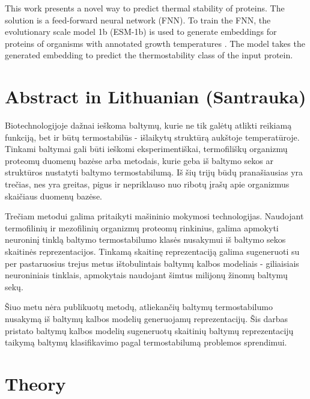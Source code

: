 \documentclass[12pt]{article}
\begin{document}
	This work presents a novel way to predict thermal stability of proteins. 
	The solution is a feed-forward neural network (FNN). To train the FNN, 
	the evolutionary scale model 1b (ESM-1b)\cite{rives2021biological} is used to 
	generate embeddings for proteins of organisms with annotated growth 
	temperatures \cite{engqvist_martin_karl_magnus_2018_1175609}. The model 
	takes the generated embedding to predict the thermostability class of the 
	input protein.

	\newpage

	\section{Abstract in Lithuanian (Santrauka)}

	\begin{otherlanguage}{lithuanian}
		
	\end{otherlanguage}
	
	Biotechnologijoje dažnai ieškoma baltymų, kurie ne tik 
	galėtų atlikti reikiamą funkciją, bet ir būtų termostabilūs -
	išlaikytų struktūrą aukštoje temperatūroje. Tinkami baltymai gali
	būti ieškomi eksperimentiškai, termofiliškų organizmų proteomų 
	duomenų bazėse arba metodais, kurie geba iš baltymo 
	sekos ar struktūros nustatyti baltymo termostabilumą. Iš šių trijų 
	būdų pranašiausias yra trečias, nes yra greitas, pigus ir 
	nepriklauso nuo ribotų įrašų apie organizmus skaičiaus duomenų bazėse.

	Trečiam metodui galima pritaikyti mašininio mokymosi technologijas. 
	Naudojant termofilinių ir mezofilinių organizmų proteomų rinkinius, 
	galima apmokyti neuroninį tinklą baltymo termostabilumo klasės 
	nusakymui iš baltymo sekos skaitinės reprezentacijos. Tinkamą skaitinę 
	reprezentaciją galima sugeneruoti su per pastaruosius trejus metus 
	ištobulintais baltymų kalbos modeliais - giliaisiais neuroniniais 
	tinklais, apmokytais naudojant šimtus milijonų žinomų baltymų sekų. 
	
	Šiuo metu nėra publikuotų metodų, atliekančių baltymų termostabilumo 
	nusakymą iš baltymų kalbos modelių generuojamų reprezentacijų. 
	Šis darbas pristato baltymų kalbos modelių sugeneruotų skaitinių 
	baltymų reprezentacijų taikymą baltymų klasifikavimo pagal 
	termostabilumą problemos sprendimui.

	\newpage

	\section{Theory}
\end{document}
